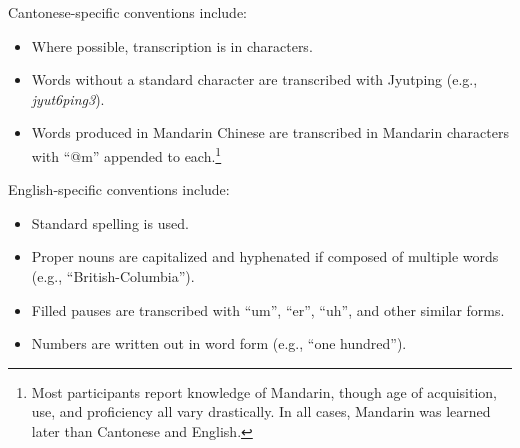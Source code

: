 Cantonese-specific conventions include:
\begin{itemize}
 \item Where possible, transcription is in characters.
 \item Words without a standard character are transcribed with Jyutping (e.g., \textit{jyut6ping3}).

 \item Words produced in Mandarin Chinese are transcribed in Mandarin characters with ``@m'' appended to each.\footnote{Most participants report knowledge of Mandarin, though age of acquisition, use, and proficiency all vary drastically. In all cases, Mandarin was learned later than Cantonese and English.}
\end{itemize}

English-specific conventions include:
\begin{itemize}
 \item Standard spelling is used.
 \item Proper nouns are capitalized and hyphenated if composed of multiple words (e.g., ``British-Columbia'').
 \item Filled pauses are transcribed with ``um'', ``er'', ``uh'', and other similar forms.
 \item Numbers are written out in word form (e.g., ``one hundred'').
\end{itemize}

